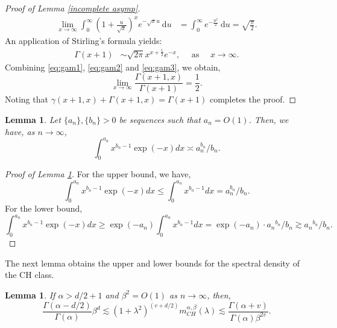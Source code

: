 \documentclass[ejs,noshowframe]{imsart}
\theoremstyle{plain}
\newtheorem{lemma}[theorem]{Lemma}
\theoremstyle{definition}
\theoremstyle{remark}
\begin{document}
\begin{appendix}
\begin{proof}[Proof of Lemma \ref{incomplete asymp}]
\begin{align}
\lim _{x \rightarrow \infty} \int_0^{\infty}\left(1+\frac{u}{\sqrt{x}}\right)^x e^{-\sqrt{x} u} \mathrm{~d} u &=\int_0^{\infty} e^{-\frac{u^2}{2}} \mathrm{~d} u=\sqrt{\frac{\pi}{2}}.\label{eq:gam2}
\end{align}
An application of Stirling's formula yields:
\begin{align}
\Gamma(x+1) &\sim \sqrt{2 \pi} x^{x+\frac{1}{2}} e^{-x}, \quad \text { as } \quad x \rightarrow \infty.\label{eq:gam3}
\end{align}
Combining \eqref{eq:gam1}, \eqref{eq:gam2} and \eqref{eq:gam3}, we obtain,
$$
\lim _{x \rightarrow \infty} \frac{\Gamma(x+1, x)}{\Gamma(x+1)}=\frac{1}{2}.
$$
Noting that $\gamma(x+1,x) + \Gamma(x+1,x)=\Gamma(x+1)$ completes the proof. 
\end{proof}

\begin{lemma}
Let $\{a_n\}, \{b_n\}>0$ be sequences such that  $a_n=O(1)$. Then, we have, as $n\to\infty$,
\begin{displaymath}
    \int_{0}^{a_n} x^{b_n-1} \exp(-x) dx \asymp a_n^{b_n}/b_n.
\end{displaymath}
\label{incomplete integrate}
\end{lemma}
\begin{proof}[Proof of Lemma \ref{incomplete integrate}]
For the upper bound, we have,
\begin{displaymath}
    \int_{0}^{a_n} x^{b_n-1} \exp(-x) dx \leq  \int_{0}^{a_n} x^{b_n-1} dx =a_n^{b_n}/b_n .
\end{displaymath}
For the lower bound, 
\begin{displaymath}
    \int_{0}^{a_n} x^{b_n-1} \exp(-x) dx  \ge \exp(-a_n)\int_{0}^{a_n} x^{b_n-1} dx = \exp(-a_n)\cdot{a_n}^{b_n} /{b_n} \gtrsim {a_n}^{b_n} /{b_n}. 
\end{displaymath}
\end{proof} 

The next lemma obtains the upper and lower bounds for the spectral density of the CH class.
\begin{lemma} \label{inequality about ch spectral density}
If $\alpha>d/2+1$ and $\beta^2=O(1)$  as $n \to \infty$, then,
$$
\frac{\Gamma(\alpha-d/2)}{\Gamma(\alpha)}\beta^{d} \lesssim (1+\lambda^2)^{(v+d/2)}m^{\alpha,\beta}_{CH}(\lambda) \lesssim \frac{\Gamma(\alpha +v)}{\Gamma(\alpha )\beta^{2v}}.
$$
\end{lemma}


\end{appendix}
\end{document}
